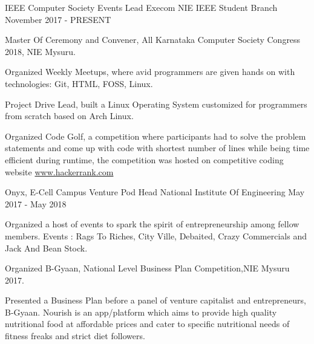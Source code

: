 

\begin{cventries}

  \cventry
    {IEEE Computer Society} %
    {Events Lead Execom} %
    {NIE IEEE Student Branch} %
    {November 2017 - PRESENT} %
    {
      \begin{cvitems} %
        \item {Master Of Ceremony and Convener, All Karnataka Computer Society Congress 2018, NIE Mysuru.}
        \item {Organized Weekly Meetups, where avid programmers are given hands on with technologies: Git, HTML, FOSS, Linux.}
        \item {Project Drive Lead, built a Linux Operating System customized for programmers from scratch based on Arch Linux.}
         \item {Organized Code Golf, a competition where participants had to solve the problem statements and come up with code with shortest number of lines while being time efficient during runtime, the competition was hosted on competitive coding website \href{https://www.hackerrank.com}{www.hackerrank.com}}
      \end{cvitems}
    }

  \cventry
    {Onyx, E-Cell} %
    {Campus Venture Pod Head} %
    {National Institute Of Engineering} %
    {May 2017 - May 2018} %
    {
      \begin{cvitems} %
        \item {Organized a host of events to spark the spirit of entrepreneurship among fellow members. Events : Rags To Riches, City Ville, Debaited, Crazy Commercials and Jack And Bean Stock.}
        \item {Organized B-Gyaan, National Level Business Plan Competition,NIE Mysuru 2017.}
        \item {Presented a Business Plan before a panel of venture capitalist and entrepreneurs, B-Gyaan. Nourish is an app/platform which aims to provide high quality nutritional food at affordable prices and cater to specific nutritional needs of fitness freaks and strict diet followers.}
      \end{cvitems}
    }


\end{cventries}
